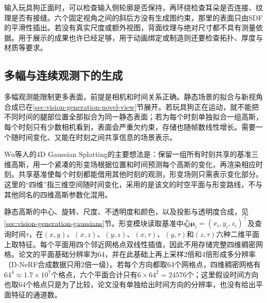 输入玩具狗正面时，可以检查输入侧轮廓是否保持，再环绕检查耳朵是否连接、纹理是否有接缝。六个固定视角之间的斜后方没有生成图约束，那里的表面只由SDF的平滑性插出。若没有真实尺度或额外视图，背面纹理与绝对尺寸都不具有测量依据。用于展示的成果也许已经足够，用于动画绑定或制造则还要检查拓扑、厚度与材质等要求。

\subsection{多幅与连续观测下的生成}
\label{sec:vision-multigen-observed-space}
\label{sec:vision-multigen-4dgs}

多幅观测能限制更多表面，前提是相机和时间关系正确。静态场景的拟合与新视角合成已在\ref{sec:vision-generation-novel-view}节展开。若玩具狗正在运动，就不能把不同时间的腿部位置全部拟合为同一静态表面；若为每个时刻单独拟合一组高斯，每个时刻只有少数相机看到，表面会严重欠约束，存储也随帧数线性增长。需要一个随时间变化、又能在时刻之间共享信息的场景表示。

Wu等人的4D Gaussian Splatting的主要想法是：保留一组所有时刻共享的基准三维高斯，用一个紧凑的形变场根据位置和时间预测每个高斯的变化，再渲染相应时刻。共享基准使每个时刻都能借用其他时刻的观测，形变场则只需表示变化部分。这里的“四维”指三维空间随时间变化，采用的是该文的时空平面与形变路线，不与其他同名的四维高斯参数化混用。

静态高斯的中心、旋转、尺度、不透明度和颜色，以及投影与透明度合成，见\ref{sec:vision-generation-gaussians}节。形变模块读取基准中心$\bm\mu_i=(x_i,y_i,z_i)^\top$及查询时间$\tau$，在$(x,y)$、$(x,z)$、$(y,z)$、$(x,\tau)$、$(y,\tau)$和$(z,\tau)$六种二维平面上取特征。每个平面用四个邻近网格点双线性插值，因此不用存储完整四维稠密网格。论文的平面基础分辨率为64，并在此基础上再上采样2倍和4倍形成多分辨率（D-NeRF合成数据只用2倍一级）。若每个方向都取64个网格点，四维稠密网格有$64^4\approx1.7\times10^7$个格点，六个平面合计只有$6\times64^2=24576$个；这里假设时间方向也取64个格点只是为了比较，论文没有单独给出时间方向的分辨率，也没有给出平面特征的通道数。

